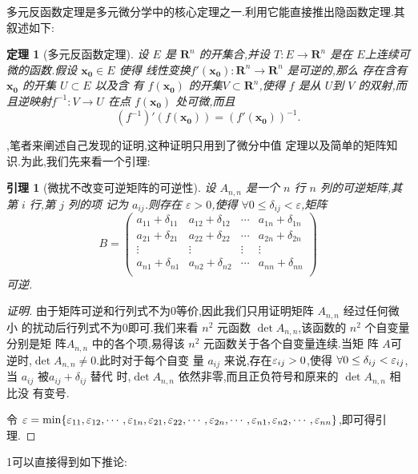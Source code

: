 \documentclass[twoside,11pt]{article}
\newtheorem{theorem}{定理}
\newtheorem{lemma}{引理}
\begin{document}
多元反函数定理是多元微分学中的核心定理之一.利用它能直接推出隐函数定理.其
叙述如下:
\begin{theorem}[多元反函数定理\cite{tao}]
  设 $E$ 是 $\mathbf{R}^n$ 的开集合,并设 $T:E\to
  \mathbf{R}^n$ 是在 $E$上连续可微的函数.假设 $\mathbf{x_0}\in E$ 使得
  线性变换$f'(\mathbf{x_0}):\mathbf{R}^n\to \mathbf{R}^n$ 是可逆的,那么
  存在含有$\mathbf{x_0}$ 的开集 $U\subset E$ 以及含
  有 $f(\mathbf{x_0})$ 的开集$V\subset
  \mathbf{R}^n$,使得 $f$ 是从 $U$到 $V$ 的双射,而且逆映射$f^{-1}:V\to
  U$ 在点 $f(\mathbf{x_0})$ 处可微,而且
$$
(f^{-1})'(f(\mathbf{x_0}))=(f'(\mathbf{x_0}))^{-1}.
$$
\end{theorem}
\bigskip{},笔者来阐述自己发现的证明,这种证明只用到了微分中值
定理以及简单的矩阵知识.为此,我们先来看一个引理:
\begin{lemma}[微扰不改变可逆矩阵的可逆性]
  设 $A_{n,n}$ 是一个 $n$ 行 $n$ 列的可逆矩阵,其第 $i$ 行,第 $j$ 列的项
  记为 $a_{ij}$.则存在 $\varepsilon>0$,使得 $\forall 0\leq
  \delta_{ij}<\varepsilon$,矩阵
$$
B=\begin{pmatrix}
  a_{11}+\delta_{11}&a_{12}+\delta_{12}&\cdots&a_{1n}+\delta_{1n}\\
  a_{21}+\delta_{21}&a_{22}+\delta_{22}&\cdots&a_{2n}+\delta_{2n}\\
  \vdots&\vdots&\vdots&\vdots\\
  a_{n1}+\delta_{n1}&a_{n2}+\delta_{n2}&\cdots&a_{nn}+\delta_{nn}\\
\end{pmatrix}
$$
可逆.
\end{lemma}
\begin{proof}[证明]
由于矩阵可逆和行列式不为0等价,因此我们只用证明矩阵 $A_{n,n}$ 经过任何微小
的扰动后行列式不为0即可.我们来看 $n^2$ 元函数 $\det A_{n,n}$,该函数的 $n^2$ 个自变量分别是矩
  阵$A_{n,n}$ 中的各个项,易得该 $n^2$ 元函数关于各个自变量连续.当矩
  阵 $A$可逆时,$\det A_{n,n}\neq 0$.此时对于每个自变
  量 $a_{ij}$ 来说,存在$\varepsilon_{ij}>0$,使得 $\forall
  0\leq\delta_{ij}<\varepsilon_{ij}$,当 $a_{ij}$ 被$a_{ij}+\delta_{ij}$ 替代
  时,$\det A_{n,n}$ 依然非零,而且正负符号和原来的 $\det A_{n,n}$ 相比没
  有变号.

  令 $\varepsilon=\min
  \{\varepsilon_{11},\varepsilon_{12},\cdots,\varepsilon_{1n},\varepsilon_{21},\varepsilon_{22},\cdots,\varepsilon_{2n},\cdots,\varepsilon_{n1},\varepsilon_{n2},\cdots,\varepsilon_{nn}\}$,即可得引理.
\end{proof}
1可以直接得到如下推论:
\end{document}
